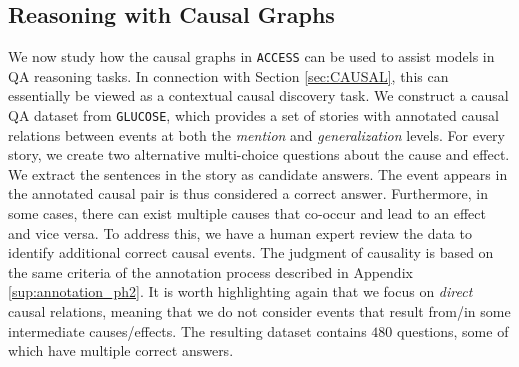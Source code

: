 
\begin{table}[!h]
\centering
{}
\caption{Experiment results of multi-choice Abstract QA+ with bi-level COT prompting. }
\label{tab:causal_reasoning_abstract_qa}
\end{table}



\subsection{Reasoning with Causal Graphs}\label{sec:QA}

We now study how the causal graphs in \texttt{ACCESS} can be used to assist models in QA reasoning tasks. In connection with Section \ref{sec:CAUSAL}, this can essentially be viewed as a contextual causal discovery task. We construct a causal QA dataset from \texttt{GLUCOSE}, which provides a set of stories with annotated causal relations between events at both the \textit{mention} and \textit{generalization} levels. For every story, we create two alternative multi-choice questions about the cause and effect. We extract the sentences in the story as candidate answers. The event appears in the annotated causal pair is thus considered a correct answer. Furthermore, in some cases, there can exist multiple causes that co-occur and lead to an effect and vice versa. To address this, we have a human expert review the data to identify additional correct causal events. The judgment of causality is based on the same criteria of the annotation process described in Appendix \ref{sup:annotation_ph2}. It is worth highlighting again that we focus on \textit{direct} causal relations, meaning that we do not consider events that result from/in some intermediate causes/effects. The resulting dataset contains $480$ questions, some of which have multiple correct answers. 

